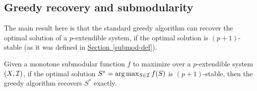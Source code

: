 \subsection{Greedy recovery and submodularity}

The main result here is that the standard greedy algorithm can recover the optimal solution of a $p$-extendible system, if the optimal solution is $(p+1)$-stable (as it was defined in \hyperref[submod-def]{Section~\ref{submod-def}}). 

\begin{theorem} \label{th:submod}
Given a monotone submodular function $f$ to maximize over a $p$-extendible system $(X,\mathcal{I})$, if the optimal solution $S^*=\arg\max_{S\in \mathcal{I}}f(S)$ is $(p+1)$-stable, then the greedy algorithm recovers $S^*$ exactly.
\end{theorem}

